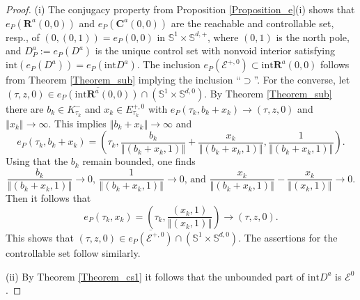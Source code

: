 \documentclass{siamltex}%
\begin{document}
\begin{proof}
(i) The conjugacy property from Proposition \ref{Proposition_e}(i) shows that
$e_{P}(\mathbf{R}^{a}(0,0))$ and $e_{P}(\mathbf{C}^{a}(0,0))$ are the
reachable and controllable set, resp., of $(0,(0,1))=e_{P}(0,0)$ in
$\mathbb{S}^{1}\times\mathbb{S}^{d,+}$, where $(0,1)$ is the north pole, and
$D_{P}^{a}:=e_{P}(D^{a})$ is the unique control set with nonvoid interior
satisfying $\mathrm{int}(e_{P}(D^{a}))=e_{P}(\mathrm{int}D^{a})$. The
inclusion $e_{P}(\mathcal{E}^{+,0})\subset\mathrm{int}\mathbf{R}^{a}(0,0)$
follows from Theorem \ref{Theorem_sub} implying the inclusion
\textquotedblleft$\supset$\textquotedblright. For the converse, let
$(\tau,z,0)\in\overline{e_{P}(\mathrm{int}\mathbf{R}^{a}(0,0))}\cap\left(
\mathbb{S}^{1}\times\mathbb{S}^{d,0}\right)  $. By Theorem \ref{Theorem_sub}
there are $b_{k}\in K_{\tau_{k}}^{-}$ and $x_{k}\in E_{\tau_{k}}^{+,0}$ with
$e_{P}(\tau_{k},b_{k}+x_{k})\rightarrow(\tau,z,0)$ and $\left\Vert
x_{k}\right\Vert \rightarrow\infty$. This implies $\left\Vert b_{k}%
+x_{k}\right\Vert \rightarrow\infty$ and%
\[
e_{P}(\tau_{k},b_{k}+x_{k})=\left(  \tau_{k},\frac{b_{k}}{\left\Vert
(b_{k}+x_{k},1)\right\Vert }+\frac{x_{k}}{\left\Vert (b_{k}+x_{k}%
,1)\right\Vert },\frac{1}{\left\Vert (b_{k}+x_{k},1)\right\Vert }\right)  .
\]
Using that the $b_{k}$ remain bounded, one finds%
\[
\frac{b_{k}}{\left\Vert (b_{k}+x_{k},1)\right\Vert }\rightarrow0,\,\frac
{1}{\left\Vert (b_{k}+x_{k},1)\right\Vert }\rightarrow0\text{, and }%
\frac{x_{k}}{\left\Vert (b_{k}+x_{k},1)\right\Vert }-\frac{x_{k}}{\left\Vert
(x_{k},1)\right\Vert }\rightarrow0\text{.}%
\]
Then it follows that
\[
e_{P}(\tau_{k},x_{k})=\left(  \tau_{k},\frac{(x_{k},1)}{\left\Vert
(x_{k},1)\right\Vert }\right)  \rightarrow(\tau,z,0).
\]
This shows that $(\tau,z,0)\in\overline{e_{P}(\mathcal{E}^{+,0})}\cap\left(
\mathbb{S}^{1}\times\mathbb{S}^{d,0}\right)  $. The assertions for the
controllable set follow similarly.

(ii) By Theorem \ref{Theorem_cs1} it follows that the unbounded part of
$\mathrm{int}D^{a}$ is $\mathcal{E}^{0}$.
\end{proof}
\end{document}
